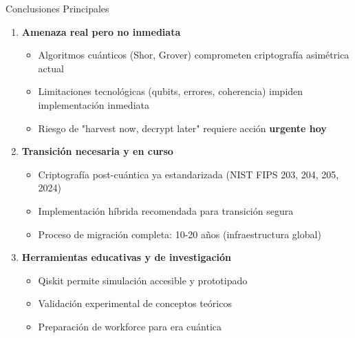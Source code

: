 \documentclass[aspectratio=169]{beamer}
\begin{document}
\begin{frame}{Conclusiones Principales}
\begin{enumerate}
\item \textbf{Amenaza real pero no inmediata}
\begin{itemize}
\item Algoritmos cuánticos (Shor, Grover) comprometen criptografía asimétrica actual
\item Limitaciones tecnológicas (qubits, errores, coherencia) impiden implementación inmediata
\item Riesgo de "harvest now, decrypt later" requiere acción \textbf{urgente hoy}
\end{itemize}

\vspace{0.3cm}
\item \textbf{Transición necesaria y en curso}
\begin{itemize}
\item Criptografía post-cuántica ya estandarizada (NIST FIPS 203, 204, 205, 2024)
\item Implementación híbrida recomendada para transición segura
\item Proceso de migración completa: 10-20 años (infraestructura global)
\end{itemize}

\vspace{0.3cm}
\item \textbf{Herramientas educativas y de investigación}
\begin{itemize}
\item Qiskit permite simulación accesible y prototipado
\item Validación experimental de conceptos teóricos
\item Preparación de workforce para era cuántica
\end{itemize}
\end{enumerate}
\end{frame}
\end{document}

